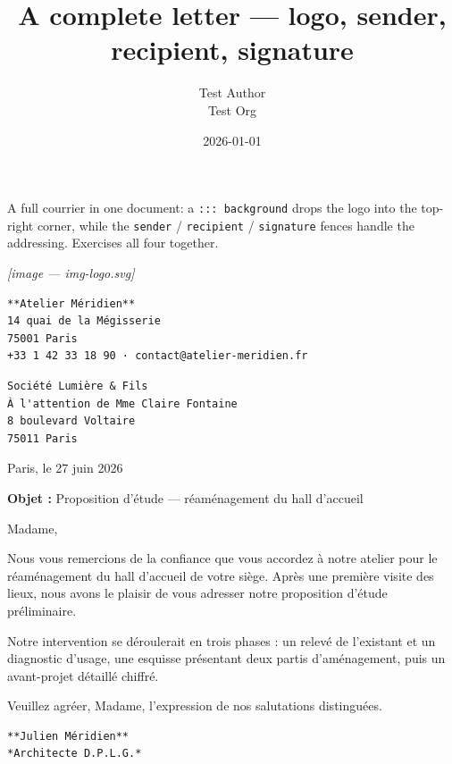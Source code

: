 \documentclass[11pt,a4paper]{article}
\title{A complete letter — logo, sender, recipient, signature}
\author{Test Author \\ Test Org}
\date{2026-01-01}
\theoremstyle{definition}
\begin{document}
\maketitle

A full courrier in one document: a \texttt{::: background} drops the logo into
the top-right corner, while the \texttt{sender} / \texttt{recipient} / \texttt{signature}
fences handle the addressing. Exercises all four together.


\begin{tcolorbox}[breakable, colback=gray!5, colframe=gray!50, title=Background]
\textit{[image — img-logo.svg]}
\end{tcolorbox}


\begin{lstlisting}
**Atelier Méridien**
14 quai de la Mégisserie
75001 Paris
+33 1 42 33 18 90 · contact@atelier-meridien.fr
\end{lstlisting}


\begin{lstlisting}
Société Lumière & Fils
À l'attention de Mme Claire Fontaine
8 boulevard Voltaire
75011 Paris
\end{lstlisting}


Paris, le 27 juin 2026


\textbf{Objet :} Proposition d'étude — réaménagement du hall d'accueil


Madame,


Nous vous remercions de la confiance que vous accordez à notre atelier
pour le réaménagement du hall d'accueil de votre siège. Après une
première visite des lieux, nous avons le plaisir de vous adresser notre
proposition d'étude préliminaire.


Notre intervention se déroulerait en trois phases : un relevé de
l'existant et un diagnostic d'usage, une esquisse présentant deux partis
d'aménagement, puis un avant-projet détaillé chiffré.


Veuillez agréer, Madame, l'expression de nos salutations distinguées.


\begin{lstlisting}
**Julien Méridien**
*Architecte D.P.L.G.*
\end{lstlisting}
\end{document}
